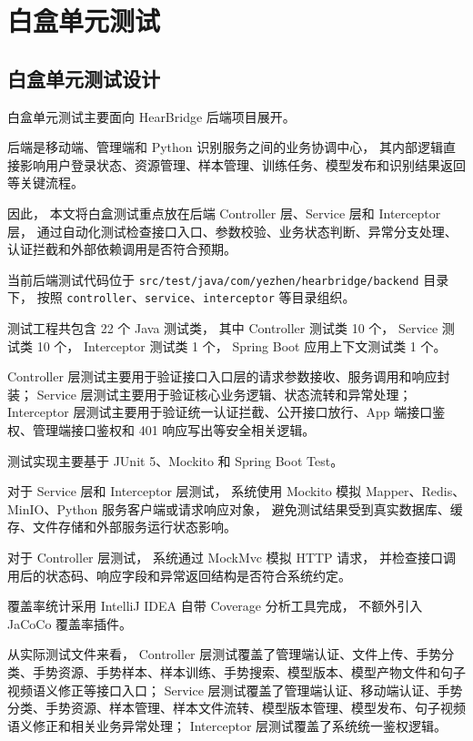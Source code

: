 
\section{白盒单元测试}

\subsection{白盒单元测试设计}

白盒单元测试主要面向 HearBridge 后端项目展开。

后端是移动端、管理端和 Python 识别服务之间的业务协调中心，
其内部逻辑直接影响用户登录状态、资源管理、样本管理、训练任务、模型发布和识别结果返回等关键流程。

因此，
本文将白盒测试重点放在后端 Controller 层、Service 层和 Interceptor 层，
通过自动化测试检查接口入口、参数校验、业务状态判断、异常分支处理、认证拦截和外部依赖调用是否符合预期。

当前后端测试代码位于 \texttt{src/test/java/com/yezhen/hearbridge/backend} 目录下，
按照 \texttt{controller}、\texttt{service}、\texttt{interceptor} 等目录组织。

测试工程共包含 22 个 Java 测试类，
其中 Controller 测试类 10 个，
Service 测试类 10 个，
Interceptor 测试类 1 个，
Spring Boot 应用上下文测试类 1 个。

Controller 层测试主要用于验证接口入口层的请求参数接收、服务调用和响应封装；
Service 层测试主要用于验证核心业务逻辑、状态流转和异常处理；
Interceptor 层测试主要用于验证统一认证拦截、公开接口放行、App 端接口鉴权、管理端接口鉴权和 401 响应写出等安全相关逻辑。

测试实现主要基于 JUnit 5、Mockito 和 Spring Boot Test。

对于 Service 层和 Interceptor 层测试，
系统使用 Mockito 模拟 Mapper、Redis、MinIO、Python 服务客户端或请求响应对象，
避免测试结果受到真实数据库、缓存、文件存储和外部服务运行状态影响。

对于 Controller 层测试，
系统通过 MockMvc 模拟 HTTP 请求，
并检查接口调用后的状态码、响应字段和异常返回结构是否符合系统约定。

覆盖率统计采用 IntelliJ IDEA 自带 Coverage 分析工具完成，
不额外引入 JaCoCo 覆盖率插件。

从实际测试文件来看，
Controller 层测试覆盖了管理端认证、文件上传、手势分类、手势资源、手势样本、样本训练、手势搜索、模型版本、模型产物文件和句子视频语义修正等接口入口；
Service 层测试覆盖了管理端认证、移动端认证、手势分类、手势资源、样本管理、样本文件流转、模型版本管理、模型发布、句子视频语义修正和相关业务异常处理；
Interceptor 层测试覆盖了系统统一鉴权逻辑。

